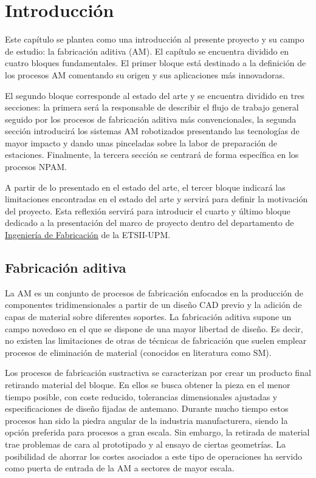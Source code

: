 \chapter{Introducción} \label{cap: introduccion}

Este capítulo se plantea como una introducción al presente proyecto y su campo de estudio: la fabricación aditiva (\acrshort{AM}). El capítulo se encuentra dividido en cuatro bloques fundamentales. El primer bloque está destinado a la definición de los procesos \acrshort{AM} comentando su origen y sus aplicaciones más innovadoras.

El segundo bloque corresponde al estado del arte y se encuentra dividido en tres secciones: la primera será la responsable de describir el flujo de trabajo general seguido por los procesos de fabricación aditiva más convencionales, la segunda sección introducirá los sistemas \acrshort{AM} robotizados presentando las tecnologías de mayor impacto y dando unas pinceladas sobre la labor de preparación de estaciones. Finalmente, la tercera sección se centrará de forma específica en los procesos \acrshort{NPAM}.

A partir de lo presentado en el estado del arte, el tercer bloque indicará las limitaciones encontradas en el estado del arte y servirá para definir la motivación del proyecto. Esta reflexión servirá para introducir el cuarto y último bloque dedicado a la presentación del marco de proyecto dentro del departamento de \hyperlink{https://fabricacion.industriales.upm.es/}{Ingeniería de Fabricación} de la ETSII-UPM.

\section{Fabricación aditiva}
La \acrfull{AM} es un conjunto de procesos de fabricación enfocados en la producción de componentes tridimensionales a partir de un diseño \acrshort{CAD} previo y la adición de capas de material sobre diferentes soportes. La fabricación aditiva supone un campo novedoso en el que se dispone de una mayor libertad de diseño. Es decir, no existen las limitaciones de otras de técnicas de fabricación que suelen emplear procesos de eliminación de material (conocidos en literatura como \acrfull{SM}).

Los procesos de fabricación sustractiva se caracterizan por crear un producto final retirando material del bloque. En ellos se busca obtener la pieza en el menor tiempo posible, con coste reducido, tolerancias dimensionales ajustadas y especificaciones de diseño fijadas de antemano. Durante mucho tiempo estos procesos han sido la piedra angular de la industria manufacturera, siendo la opción  preferida para procesos a gran escala. Sin embargo, la retirada de material trae problemas de cara al prototipado y al ensayo de ciertas geometrías. La posibilidad de ahorrar los costes asociados a este tipo de operaciones ha servido como puerta de entrada de la \acrshort{AM} a sectores de mayor escala.

